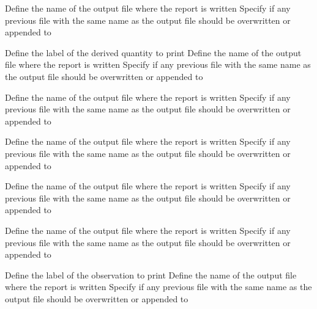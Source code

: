  {Define the name of the output file where the report is written}
 {Specify if any previous file with the same name as the output file should be overwritten or appended to}
\par\textbf{}\par
{} {Define the label of the derived quantity to print}
 {Define the name of the output file where the report is written}
 {Specify if any previous file with the same name as the output file should be overwritten or appended to}
\par\textbf{}\par
{} {Define the name of the output file where the report is written}
 {Specify if any previous file with the same name as the output file should be overwritten or appended to}
\par\textbf{}\par
{} {Define the name of the output file where the report is written}
 {Specify if any previous file with the same name as the output file should be overwritten or appended to}
\par\textbf{}\par
{} {Define the name of the output file where the report is written}
 {Specify if any previous file with the same name as the output file should be overwritten or appended to}
\par\textbf{}\par
{} {Define the name of the output file where the report is written}
 {Specify if any previous file with the same name as the output file should be overwritten or appended to}
\par\textbf{}\par
{} {Define the label of the observation to print}
 {Define the name of the output file where the report is written}
 {Specify if any previous file with the same name as the output file should be overwritten or appended to}
\par\textbf{}\par
